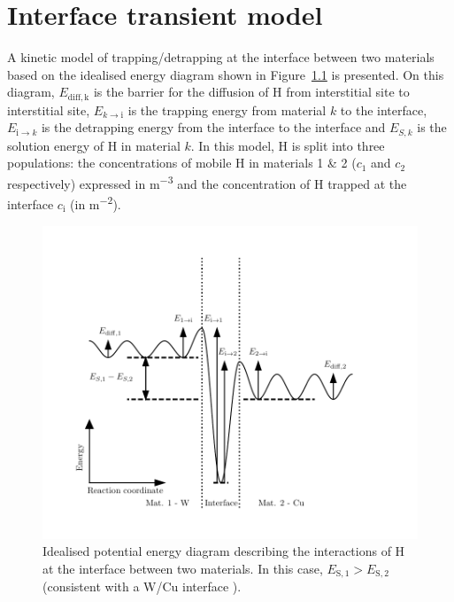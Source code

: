 \chapter{Interface transient model}

A kinetic model of trapping/detrapping at the interface between two materials based on the idealised energy diagram shown in Figure~\ref{fig:diagram_E} is presented.
On this diagram, $E_\mathrm{diff,k}$ is the barrier for the diffusion of H from interstitial site to interstitial site, $E_{k\rightarrow \mathrm{i}}$ is the trapping energy from material $k$ to the interface, $E_{\mathrm{i}\rightarrow k}$ is the detrapping energy from the interface to the interface and $E_{S,k}$ is the solution energy of H in material $k$.
In this model, H is split into three populations: the concentrations of mobile H in materials 1 \& 2 ($c_1$ and $c_2$ respectively) expressed in \si{m^{-3}} and the concentration of H trapped at the interface $c_\mathrm{i}$ (in \si{m^{-2}}).
\begin{figure}[ht!]
    \centering
    \includegraphics[width=\linewidth]{Figures/appendix/interface_E.pdf}
    \caption{Idealised potential energy diagram describing the interactions of H at the interface between two materials. In this case, $E_\mathrm{S,1}>E_\mathrm{S,2}$ (consistent with a W/Cu interface ).}
    \label{fig:diagram_E}
\end{figure}
